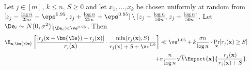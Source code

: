 \begin{claim}\label{cl:A-5}
Let $j\in [m]$, $k\leq n$, $S\geq 0$ and let $x_1,\ldots,x_k$
be chosen uniformly at random from
$[z_j-\frac{\log n}{25 n}-\eps^{0.95},z_j+\frac{\log n}{25 n}+\eps^{0.95}] \setminus [z_j-\frac{\log n}{50 n},z_j+\frac{\log n}{50 n}]$.
Let $\De_i \sim N(0,\sigma^2)|_{|\De_i|<\ve^{0.95}}$.
Then
\begin{align*}
\E_{{\bf x},\bm{\De}} \left[ \frac{|r_j({\bf x}+\bm{\De})-r_j({\bf x})|}{r_j({\bf x})}\cdot \frac{\min(r_j({\bf x}),S)}
 {r_j({\bf x})+S+\ve^{1.6}}\right]
\ll  \ve^{1.05}+ k\frac{\sigma n}{\log n}  \cdot \Pr_{{\bf x}}[r_j({\bf x})\ge S]\\
+\sigma \frac{n}{\log n}\sqrt{k} \Expect{{\bf x}}{\frac{r_j({\bf x})}{r_j({\bf x})+S}}.
\end{align*}
\end{claim}
